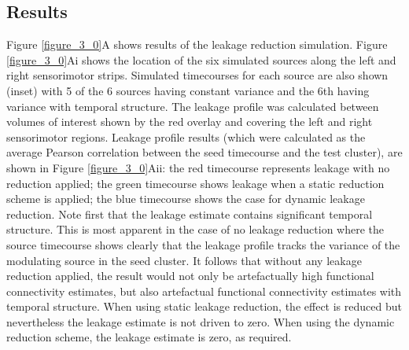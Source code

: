 \subsection{Results}
Figure \ref{figure_3_0}A shows results of the leakage reduction simulation. Figure \ref{figure_3_0}Ai shows the location of the six simulated sources along the left and right sensorimotor strips. Simulated timecourses for each source are also shown (inset) with 5 of the 6 sources having constant variance and the 6th having variance with temporal structure. The leakage profile was calculated between volumes of interest shown by the red overlay and covering the left and right sensorimotor regions. Leakage profile results (which were calculated as the average Pearson correlation between the seed timecourse and the test cluster), are shown in Figure \ref{figure_3_0}Aii: the red timecourse represents leakage with no reduction applied; the green timecourse shows leakage when a static reduction scheme is applied; the blue timecourse shows the case for dynamic leakage reduction. Note first that the leakage estimate contains significant temporal structure. This is most apparent in the case of no leakage reduction where the source timecourse shows clearly that the leakage profile tracks the variance of the modulating source in the seed cluster. It follows that without any leakage reduction applied, the result would not only be artefactually high functional connectivity estimates, but also artefactual functional connectivity estimates with temporal structure. When using static leakage reduction, the effect is reduced but nevertheless the leakage estimate is not driven to zero. When using the dynamic reduction scheme, the leakage estimate is zero, as required.

